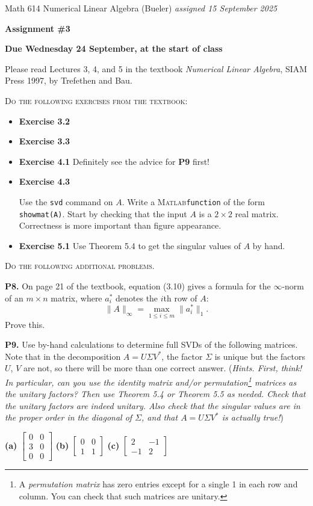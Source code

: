 \documentclass[12pt]{amsart}
\newcommand{\prob}[1]{\bigskip\noindent\textbf{#1.}\quad }
\newcommand{\Matlab}{\textsc{Matlab}\xspace}
\newcommand{\ds}{\displaystyle}
\begin{document}
\scriptsize \noindent Math 614 Numerical Linear Algebra (Bueler) \hfill \emph{assigned 15 September 2025}
\normalsize\medskip

\Large\centerline{\textbf{Assignment \#3}}
\large
\medskip

\centerline{\textbf{Due Wednesday 24 September, at the start of class}}
\medskip
\normalsize

\thispagestyle{empty}

\bigskip

\noindent Please read Lectures 3, 4, and 5 in the textbook \emph{Numerical Linear Algebra}, SIAM Press 1997, by Trefethen and Bau.

\bigskip
\noindent \textsc{Do the following exercises from the textbook}:

\begin{itemize}[itemsep=4pt]
\item \textbf{Exercise 3.2}
\item \textbf{Exercise 3.3}
\item \textbf{Exercise 4.1} \qquad Definitely see the advice for \textbf{P9} first!
\item \textbf{Exercise 4.3} \qquad \begin{minipage}[t]{0.7\textwidth}
Use the \texttt{svd} command on $A$.  Write a \Matlab \texttt{function} of the form \texttt{showmat(A)}.  Start by checking that the input $A$ is a $2\times 2$ real matrix.  Correctness is more important than figure appearance.\end{minipage}
\item \textbf{Exercise 5.1} \qquad Use Theorem 5.4 to get the singular values of $A$ by hand.
\end{itemize}


\medskip
\noindent \textsc{Do the following additional problems.}

\prob{P8}  On page 21 of the textbook, equation (3.10) gives a formula for the $\infty$-norm of an $m\times n$ matrix, where $a_i^*$ denotes the $i$th row of $A$:
    $$\|A\|_\infty = \max_{1\le i \le m} \|a_i^*\|_1.$$
Prove this.

\prob{P9}  Use by-hand calculations to determine full SVDs of the following matrices.  Note that in the decomposition $A = U \Sigma V^*$, the factor $\Sigma$ is unique but the factors $U$, $V$ are not, so there will be more than one correct answer.  (\emph{Hints.  First, think!  In particular, can you use the identity matrix and/or permutation\footnote{A \emph{permutation matrix} has zero entries except for a single 1 in each row and column.  You can check that such matrices are unitary.} matrices as the unitary factors?  Then use Theorem 5.4 or Theorem 5.5 as needed.  Check that the unitary factors are indeed unitary.  Also check that the singular values are in the proper order in the diagonal of $\Sigma$, and that $A = U \Sigma V^*$ is actually true!})

\bigskip
\textbf{(a)} \quad $\ds \begin{bmatrix} 0 & 0 \\ 3 & 0 \\ 0 & 0 \end{bmatrix}$ \qquad
\textbf{(b)} \quad $\ds \begin{bmatrix} 0 & 0 \\ 1 & 1 \end{bmatrix}$ \qquad
\textbf{(c)} \quad $\ds \begin{bmatrix} 2 & -1 \\ -1 & 2 \end{bmatrix}$
\end{document}
